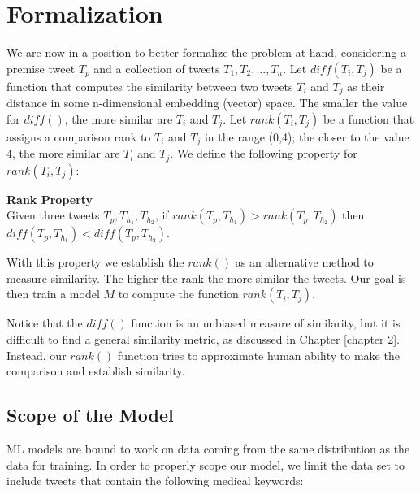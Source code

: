 \documentclass[12pt]{report}
\begin{document}
\section{Formalization}\label{formalization_problem}
We are now in a position to better formalize the problem at hand, considering a premise tweet $T_p$ and a collection of tweets 
$T_1, T_2,..., T_n$. Let $diff(T_i, T_j)$ be a function that computes the similarity between  two tweets $T_i$ and $T_j$ as their distance 
in some n-dimensional embedding (vector) space. The smaller the value for $diff()$, the more similar are $T_i$ and $T_j$.   Let $rank(T_i, T_j)$ be a function that assigns a comparison rank to $T_i$ and $T_j$ in the range (0,4); the closer to the value 4, the more similar are $T_i$ and $T_j$.
We define the following property for $rank(T_i, T_j)$:

\begin{property}{\bf Rank Property}\\ 
	Given three tweets $T_p, T_{h_1}, T_{h_2}$, if $rank(T_p, T_{h_1}) > rank(T_p, T_{h_2})$ then $diff(T_p, T_{h_1}) < diff(T_p, T_{h_2})$.
\end{property}

With this property we establish the $rank()$ as an alternative method to measure similarity. The higher the rank  the more similar the tweets. 
Our goal is then train a model $M$ to compute the function $rank(T_i, T_j)$.

Notice that the $diff()$ function is an unbiased measure of similarity, but it is difficult to find a general similarity metric, as discussed in 
Chapter \ref{chapter 2}. Instead, our $rank()$ function
tries to approximate human ability to make the comparison and establish similarity. 


\subsection{Scope of the Model}
\ac{ML} models are bound to work on data coming from the same distribution as the data for training. In order to properly scope our model, we limit the data set to include tweets that contain the following medical keywords:
\end{document}
